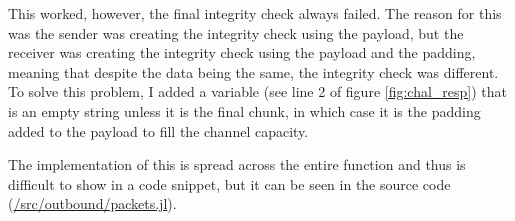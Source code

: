 This worked, however, the final integrity check always failed. The reason for this was the sender was creating the integrity check using the payload, but the receiver was creating the integrity check using the payload and the padding, meaning that despite the data being the same, the integrity check was different. To solve this problem, I added a variable  (see line 2 of figure \ref{fig:chal_resp}) that is an empty string unless it is the final chunk, in which case it is the padding added to the payload to fill the channel capacity. 

The implementation of this is spread across the entire  function and thus is difficult to show in a code snippet, but it can be seen in the source code (\url{/src/outbound/packets.jl}).

